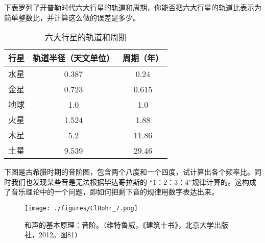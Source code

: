 \begin{exercise}{}
下表罗列了开普勒时代六大行星的轨道和周期，你能否把六大行星的轨道比表示为简单整数比，并计算这么做的误差是多少。

\begin{table}[ht]
\centering
\caption{六大行星的轨道和周期}\label{ClBohr_tab2}
\begin{tabular}{|c|c|c|}
\hline
行星 & 轨道半径（天文单位） & 周期（年） \\
\hline
水星 & 0.387 & 0.24  \\
\hline
金星 & 0.723 & 0.615 \\
\hline
地球 & 1.0 & 1.0 \\
\hline
火星 & 1.524 & 1.88 \\
\hline
木星 & 5.2 & 11.86 \\
\hline
土星 & 9.539 & 29.46 \\
\hline
\end{tabular}
\end{table}
\end{exercise}

\begin{exercise}{}
下图是古希腊时期的音阶图，包含两个八度和一个四度，试计算出各个频率比。同时我们也发现某些音是无法根据毕达哥拉斯的 “1：2：3：4”规律计算的。这构成了音乐理论中的一个问题，即如何把剩下音的规律用数字表达出来。

\begin{figure}[ht]
\centering
\texttt{[image: ./figures/ClBohr\_7.png]}
\caption{和声的基本原理：音阶。（维特鲁威，《建筑十书》，北京大学出版社，2012。图81）} \label{ClBohr_fig7}
\end{figure}
\end{exercise}
